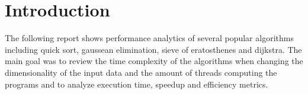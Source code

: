 \chapter{Introduction}

The following report shows performance analytics of several popular algorithms including quick sort, gaussean elimination, sieve of eratosthenes and dijkstra.
The main goal was to review the time complexity of the algorithms when changing the dimensionality of the input data and the amount of threads computing the programs
and to analyze execution time, speedup and efficiency metrics.